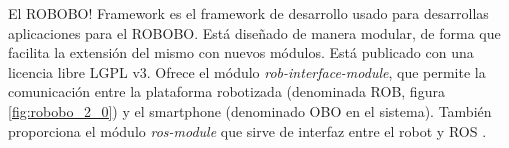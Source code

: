 El ROBOBO! Framework\cite{RoboboFramework} es el framework de desarrollo usado para desarrollas aplicaciones para el ROBOBO. Está diseñado de manera modular, de forma que facilita la extensión del mismo con nuevos módulos. Está publicado con una licencia libre LGPL v3.
Ofrece el módulo \textit{rob-interface-module}, que permite la comunicación entre la plataforma robotizada (denominada ROB, figura \ref{fig:robobo_2_0}) y el smartphone (denominado OBO en el sistema). También proporciona el módulo \textit{ros-module} que sirve de interfaz entre el robot y ROS \cite{Ros}.











 